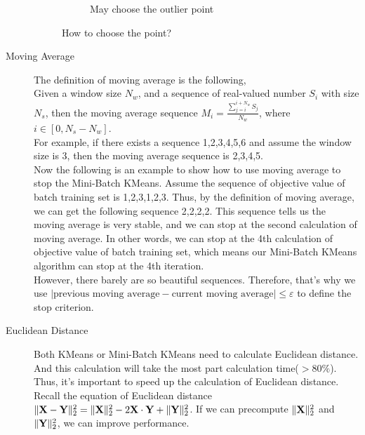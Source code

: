 \documentclass[final,leqno,onefignum,onetabnum]{siamltexmm}
\DeclarePairedDelimiter\norm{\lVert}{\rVert}%
\begin{document}
\begin{description}
\begin{figure}[H]
\begin{center}
\begin{subfigure}[H]{.5\textwidth}
			\caption{May choose the outlier point}
			\label{fig:ourlier_centroids}
		\end{subfigure}%
		\caption{How to choose the point?}
		\label{fig:centroids}
	\end{center}
\end{figure}
\item[Moving Average]

The definition of moving average is the following, \\
Given a window size $N_w$, and a sequence of real-valued number $S_i$ with size $N_s$, then the moving average sequence $M_i = \frac{\sum_{j=i}^{i+N_w} S_j}{N_w}$, where $i \in [0, N_s-N_w]$. \\

For example, if there exists a sequence 1,2,3,4,5,6 and assume the window size is 3, then the moving average sequence is 2,3,4,5. \\

Now the following is an example to show how to use moving average to stop the Mini-Batch KMeans. Assume the sequence of objective value of batch training set is 1,2,3,1,2,3. Thus, by the definition of moving average, we can get the following sequence 2,2,2,2. This sequence tells us the moving average is very stable, and we can stop at the second calculation of moving average. In other words, we can stop at the 4th calculation of objective value of batch training set, which means our Mini-Batch KMeans algorithm can stop at the 4th iteration. \\

However, there barely are so beautiful sequences. Therefore, that's why we use  $ | \text{previous moving average} - \text{current moving average} | \leq \varepsilon $ to define the stop criterion.

\item[Euclidean Distance]

Both KMeans or Mini-Batch KMeans need to calculate Euclidean distance. And this calculation will take the most part calculation time($> 80\%$). Thus, it's  important to speed up the calculation of Euclidean distance. \\

Recall the equation of Euclidean distance $ \norm{\textbf{X} - \textbf{Y}}_2^2 = \norm{\textbf{X}}_2^2 - 2\textbf{X} \cdot \textbf{Y} + \norm{\textbf{Y}}_2^2 $.
If we can precompute $\norm{\textbf{X}}_2^2$ and $\norm{\textbf{Y}}_2^2$, we can improve performance. \\ 


\end{description}
\end{document}
